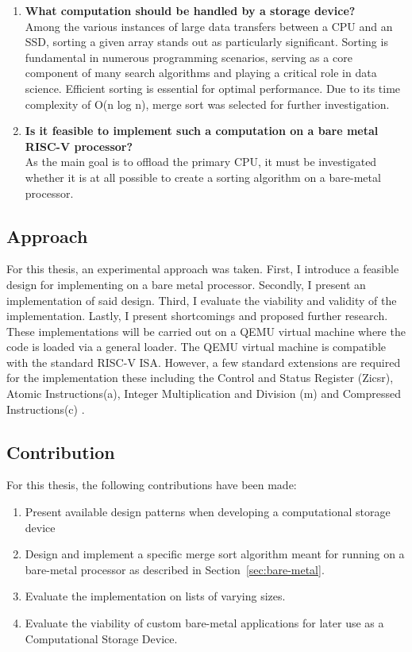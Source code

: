\begin{enumerate}
  \item {\large \textbf{What computation should be handled by a storage
    device?}}\label{sec:computational} \\
    Among the various instances of large data transfers between a CPU and an SSD,
    sorting a given array stands out as particularly significant. Sorting is
    fundamental in numerous programming scenarios, serving as a core component of
    many search algorithms and playing a critical role in data science. Efficient
    sorting is essential for optimal performance. Due to its time complexity of O(n
    log n), merge sort was selected for further investigation.
  \item {\large \textbf{ Is it feasible to implement such a computation on a
    bare metal RISC-V processor?}} \\
    As the main goal is to offload the primary CPU, it must be investigated
    whether it is at all possible to create a sorting algorithm on a bare-metal
    processor.
\end{enumerate}


\subsection{Approach}\label{sec:approach}
For this thesis, an experimental approach was taken. First, I introduce a
feasible design for implementing on a bare metal processor. Secondly, I present
an implementation of said design. Third, I evaluate the viability and validity
of the implementation. Lastly, I present shortcomings and proposed further
research. These implementations will be carried out on a QEMU virtual machine
where the code is loaded via a general loader. The QEMU virtual machine is
compatible with the standard RISC-V ISA. However, a few standard extensions are
required for the implementation these including the Control and Status Register
(Zicsr), Atomic Instructions(a), Integer Multiplication and Division (m) and
Compressed Instructions(c) \cite{RISC_priv}.

\subsection{Contribution}
For this thesis, the following contributions have been made:
\begin{enumerate}
  \item Present available design patterns when developing a computational
    storage device
  \item Design and implement a specific merge sort algorithm meant for running on a
    bare-metal processor as described in Section~\ref{sec:bare-metal}.
  \item Evaluate the implementation on lists of varying sizes.
  \item Evaluate the viability of custom bare-metal applications for later use
    as a Computational Storage Device.
\end{enumerate}


